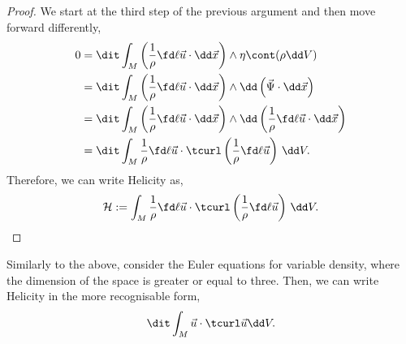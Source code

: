 \begin{proof}
  We start at the third step of the previous argument and then move forward differently,
  \begin{align*}
    0 &= \dit \int_M \left(\frac{1}{\rho}\fd \ell {\vec u} \cdot \dd \vec x\right) \wedge \eta \cont (\rho \dd V) \\
    &= \dit \int_M \left(\frac{1}{\rho}\fd \ell {\vec u} \cdot \dd \vec x\right) \wedge \dd\left( \vec\Psi \cdot \dd \vec x \right) \\
    &= \dit \int_M \left(\frac{1}{\rho}\fd \ell {\vec u} \cdot \dd \vec x\right) \wedge \dd \left( \frac{1}{\rho}\fd \ell {\vec u} \cdot \dd \vec x \right) \\
    &= \dit \int_M \frac{1}{\rho}\fd \ell {\vec u} \cdot \tcurl \left( \frac{1}{\rho}\fd \ell {\vec u} \right)\,\dd V.
  \end{align*}
  Therefore, we can write Helicity as,
  $$ \mathcal{H} := \int_M \frac{1}{\rho}\fd \ell {\vec u} \cdot \tcurl \left( \frac{1}{\rho}\fd \ell {\vec u} \right)\,\dd V. $$
\end{proof}
\noindent
Similarly to the above, consider the Euler equations for variable density, where the dimension of the space is greater or equal to three. Then, we can write Helicity in the more recognisable form,
$$ \dit \int_M \vec u \cdot \tcurl \vec u \dd V. $$


